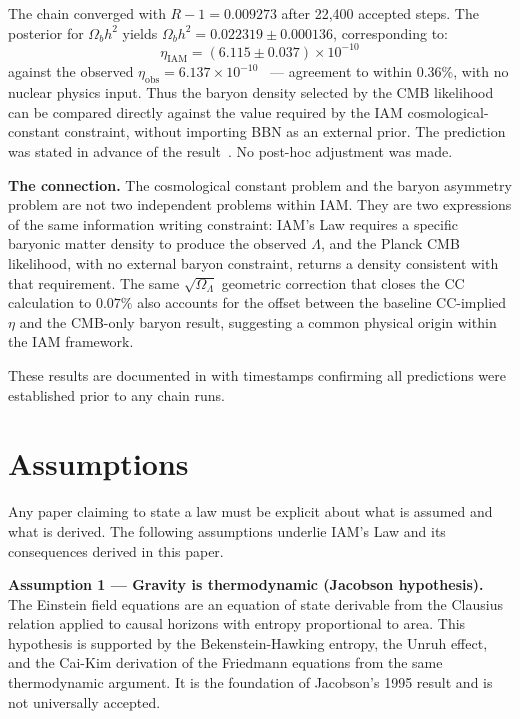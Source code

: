 \documentclass[12pt,a4paper]{article}
\begin{document}
The chain converged with $R-1 = 0.009273$ after 22{,}400 accepted
steps. The posterior for $\Omega_b h^2$
yields $\Omega_b h^2 = 0.022319 \pm 0.000136$, corresponding to:
\begin{equation}
\eta_\mathrm{IAM} = (6.115 \pm 0.037) \times 10^{-10}
\label{eq:eta_result_law}
\end{equation}
against the observed $\eta_\mathrm{obs} = 6.137 \times
10^{-10}$~\citep{Cyburt2016,PlanckVI2020} --- agreement to within
$0.36\%$, with no nuclear physics input. Thus the baryon density
selected by the CMB likelihood can be compared directly against the
value required by the IAM cosmological-constant constraint, without
importing BBN as an external prior. The prediction was stated in
advance of the result~\citep{IAM_archive}. No post-hoc adjustment
was made.

\textbf{The connection.}
The cosmological constant problem and the baryon asymmetry problem
are not two independent problems within IAM. They are two expressions
of the same information writing constraint: IAM's Law requires a
specific baryonic matter density to produce the observed $\Lambda$,
and the Planck CMB likelihood, with no external baryon constraint,
returns a density consistent with that requirement. The same
$\sqrt{\Omega_\Lambda}$ geometric correction that closes the CC
calculation to $0.07\%$ also accounts for the offset between the
baseline CC-implied $\eta$ and the CMB-only baryon result, suggesting
a common physical origin within the IAM framework.

These results are documented in \citet{IAM_archive} with timestamps
confirming all predictions were established prior to any chain runs.

\section{Assumptions}
\label{sec:assumptions}

Any paper claiming to state a law must be explicit about what is
assumed and what is derived. The following assumptions underlie
IAM's Law and its consequences derived in this paper.

\textbf{Assumption 1 --- Gravity is thermodynamic
(Jacobson hypothesis).} The Einstein field equations are an equation
of state derivable from the Clausius relation applied to causal
horizons with entropy proportional to area. This hypothesis is
supported by the Bekenstein-Hawking entropy, the Unruh effect, and
the Cai-Kim derivation of the Friedmann equations from the same
thermodynamic argument. It is the foundation of Jacobson's 1995
result and is not universally accepted.
\end{document}
